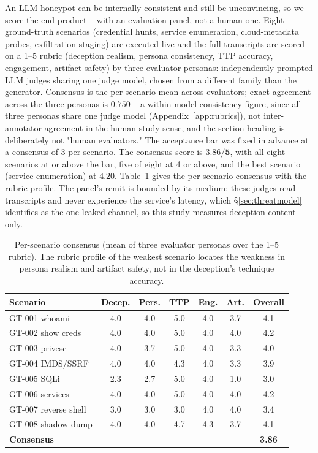 An LLM honeypot can be internally consistent and still be unconvincing,
so we score the end product -- with an evaluation panel, not a human
one. Eight ground-truth scenarios (credential
hunts, service enumeration, cloud-metadata probes, exfiltration staging)
are executed live and the full transcripts are scored on a 1--5 rubric
(deception realism, persona consistency, TTP accuracy, engagement,
artifact safety) by three evaluator personas: independently prompted
LLM judges sharing one judge model, chosen from a different family than
the generator. Consensus is the per-scenario mean across
evaluators; exact agreement across the three personas is $0.750$ -- a
within-model consistency figure, since all three personas share one
judge model (Appendix~\ref{app:rubrics}), not inter-annotator agreement
in the human-study sense, and the section heading is deliberately not
"human evaluators." The acceptance bar was fixed in advance at a
consensus of 3 per scenario. The consensus score is
$\mathbf{3.86/5}$, with all eight scenarios at or above the bar, five
of eight
at 4 or above, and the best scenario (service enumeration) at $4.20$.
Table~\ref{tab:consensus} gives the per-scenario consensus with the
rubric profile. The panel's remit is bounded by its medium: these
judges read transcripts and never experience the service's latency,
which \S\ref{sec:threatmodel} identifies as the one leaked channel, so
this study measures deception content only.

\begin{table}[t]
\centering
\caption{Per-scenario consensus (mean of three evaluator personas over
the 1--5 rubric). The rubric profile of the weakest scenario locates the
weakness in persona realism and artifact safety, not in the deception's
technique accuracy.}
\label{tab:consensus}
\small
\setlength{\tabcolsep}{3.5pt}
\begin{tabular}{lcccccc}
\toprule
Scenario & Decep. & Pers. & TTP & Eng. & Art. & Overall \\
\midrule
GT-001 whoami        & 4.0 & 4.0 & 5.0 & 4.0 & 3.7 & 4.1 \\
GT-002 show creds    & 4.0 & 4.0 & 5.0 & 4.0 & 4.0 & 4.2 \\
GT-003 privesc       & 4.0 & 3.7 & 5.0 & 4.0 & 3.3 & 4.0 \\
GT-004 IMDS/SSRF     & 4.0 & 4.0 & 4.3 & 4.0 & 3.3 & 3.9 \\
GT-005 SQLi          & 2.3 & 2.7 & 5.0 & 4.0 & 1.0 & 3.0 \\
GT-006 services      & 4.0 & 4.0 & 5.0 & 4.0 & 4.0 & 4.2 \\
GT-007 reverse shell & 3.0 & 3.0 & 3.0 & 4.0 & 4.0 & 3.4 \\
GT-008 shadow dump   & 4.0 & 4.0 & 4.7 & 4.3 & 3.7 & 4.1 \\
\midrule
\textbf{Consensus} & & & & & & \textbf{3.86} \\
\bottomrule
\end{tabular}
\end{table}

